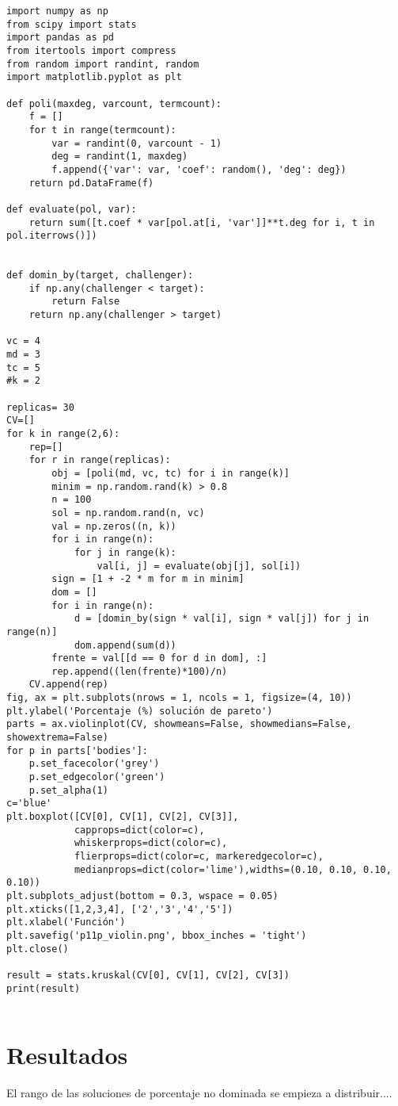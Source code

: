 \documentclass{article}
\begin{document}
\begin{lstlisting}
import numpy as np
from scipy import stats
import pandas as pd
from itertools import compress
from random import randint, random
import matplotlib.pyplot as plt

def poli(maxdeg, varcount, termcount):
    f = []
    for t in range(termcount):
        var = randint(0, varcount - 1)
        deg = randint(1, maxdeg)
        f.append({'var': var, 'coef': random(), 'deg': deg})
    return pd.DataFrame(f)
  
def evaluate(pol, var):
    return sum([t.coef * var[pol.at[i, 'var']]**t.deg for i, t in pol.iterrows()])
 
 
def domin_by(target, challenger):
    if np.any(challenger < target):
        return False
    return np.any(challenger > target)
 
vc = 4
md = 3
tc = 5
#k = 2 

replicas= 30
CV=[]
for k in range(2,6):
    rep=[]
    for r in range(replicas):
        obj = [poli(md, vc, tc) for i in range(k)]
        minim = np.random.rand(k) > 0.8
        n = 100
        sol = np.random.rand(n, vc)
        val = np.zeros((n, k))
        for i in range(n): 
            for j in range(k):
                val[i, j] = evaluate(obj[j], sol[i])
        sign = [1 + -2 * m for m in minim]
        dom = []
        for i in range(n):
            d = [domin_by(sign * val[i], sign * val[j]) for j in range(n)]
            dom.append(sum(d)) 
        frente = val[[d == 0 for d in dom], :]
        rep.append((len(frente)*100)/n)
    CV.append(rep)
fig, ax = plt.subplots(nrows = 1, ncols = 1, figsize=(4, 10))
plt.ylabel('Porcentaje (%) solución de pareto')
parts = ax.violinplot(CV, showmeans=False, showmedians=False, showextrema=False)
for p in parts['bodies']:
    p.set_facecolor('grey')
    p.set_edgecolor('green')
    p.set_alpha(1)
c='blue'
plt.boxplot([CV[0], CV[1], CV[2], CV[3]],
            capprops=dict(color=c),
            whiskerprops=dict(color=c),
            flierprops=dict(color=c, markeredgecolor=c),
            medianprops=dict(color='lime'),widths=(0.10, 0.10, 0.10, 0.10))
plt.subplots_adjust(bottom = 0.3, wspace = 0.05)
plt.xticks([1,2,3,4], ['2','3','4','5'])
plt.xlabel('Función')
plt.savefig('p11p_violin.png', bbox_inches = 'tight')
plt.close()

result = stats.kruskal(CV[0], CV[1], CV[2], CV[3])
print(result)
    
\end{lstlisting}


\section{Resultados}
El rango de las soluciones de porcentaje no dominada se empieza a distribuir....
\end{document}
